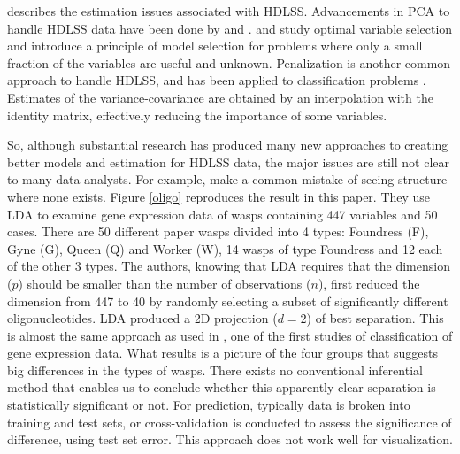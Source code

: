 \cite{marron:2007} describes the estimation issues associated with HDLSS.  
Advancements in PCA to handle HDLSS data have been done by \cite{marron:2011} and \cite{yata:2010}. \cite{donoho:2009} and \cite{donoho:2008} study optimal variable selection and introduce a principle of model selection for problems where only a small fraction of the variables are useful and unknown. Penalization is another common approach to handle HDLSS, and has been applied to classification problems \citep[e.g.][]{witten:2011, lee:2009}. Estimates of the variance-covariance are obtained by an interpolation with the identity matrix, effectively reducing the importance of some variables. 

So, although substantial research has produced many new approaches to creating better models and estimation for HDLSS data, the major issues are still not clear to many data analysts. For example, \cite{toth:2010} make a common mistake of seeing structure where none exists. Figure \ref{oligo} reproduces the result in this paper.  They use LDA to examine gene expression data of wasps containing 447 variables and 50 cases. There are 50 different paper wasps divided into 4 types: Foundress (F), Gyne (G), Queen (Q) and Worker (W), 14  wasps of type Foundress and 12 each of the other 3 types. The authors, knowing that LDA requires that the dimension ($p$) should be smaller than the number of observations ($n$), first reduced the dimension from 447 to 40 by randomly selecting a subset of significantly different oligonucleotides. LDA produced a 2D projection ($d=2$) of best separation. This is almost the same approach as used in \cite{dudoit:2002}, one of the first studies of classification of gene expression data. What results is a picture of the four groups that suggests big differences in the types of wasps. There exists no conventional inferential method that enables us to conclude whether this apparently clear separation is statistically significant or not. For prediction, typically data is broken into training and test sets, or cross-validation is conducted to assess the significance of difference, using test set error. This approach does not work well for visualization.

